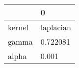 \begin{tabular}{ll}
\toprule
{} &          0 \\
\midrule
kernel &  laplacian \\
gamma  &   0.722081 \\
alpha  &      0.001 \\
\bottomrule
\end{tabular}
